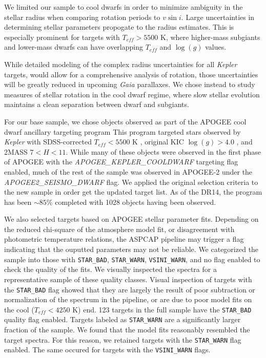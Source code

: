 \documentclass[manuscript]{aastex6}
\newcommand{\vsini}{\ensuremath{v \sin i}}
\newcommand{\Kepler}{\mbox{\textit{Kepler}}}
\newcommand{\Gaia}{\mbox{\textit{Gaia}}}
\newcommand{\Teff}{\ensuremath{T_{eff}}}
\newcommand{\logg}{\ensuremath{\log(g)}}
\newcommand{\STARBAD}{\texttt{STAR\_BAD}}
\newcommand{\STARWARN}{\texttt{STAR\_WARN}}
\newcommand{\VSINIWARN}{\texttt{VSINI\_WARN}}
\begin{document}
We limited our sample to cool dwarfs in order to minimize ambiguity in the 
stellar radius when comparing rotation periods to \vsini. Large uncertainties 
in determining stellar parameters propogate to the radius estimates. This is 
especially prominent for targets with \(\Teff > 5500\) K, where higher-mass 
subgiants and lower-mass dwarfs can have overlapping \Teff{} and
\logg{} values.

While detailed modeling of the complex radius uncertainties 
for all \Kepler{} targets, would allow for a comprehensive analysis of
rotation, those uncertainties will be greatly reduced in upcoming
\Gaia{} parallaxes. We chose instead to study measures of
stellar rotation in the cool  dwarf regime, where
slow stellar evolution maintains a clean separation between dwarf and
subgiants. 

For our base sample, we chose objects observed as part of the APOGEE cool
dwarf ancillary targeting
program
This program targeted stars observed by \Kepler{} with SDSS-corrected
\(\Teff < 5500\) K \citep{Pinsonneault12}, original KIC \(\logg > 4.0\)
\citep{Brown11}, and 2MASS \(7 < H < 11\). While many of these objects
were observed in the first phase of APOGEE with the
\textit{APOGEE\_KEPLER\_COOLDWARF} targeting flag enabled, much of the rest of
the sample was observed in APOGEE-2 under the \textit{APOGEE2\_SEISMO\_DWARF}
flag. We applied the original selection criteria to the new sample in order get
the updated target list. As of the DR14, 
the program has been \(\sim 85\)\% completed with 1028 objects having been 
observed. 

We also selected targets based on APOGEE stellar parameter fits.
Depending on the reduced chi-square of the atmosphere model fit, or
disagreement with photometric temperature relations, the ASPCAP pipeline
may trigger a flag indicating that the ouputted parameters may not be
reliable. We categorized the sample into those with \STARBAD, \STARWARN,
\VSINIWARN{}, and no flag enabled to check the quality of the fits. We
visually inspected the spectra for a representative sample of these
quality classes. 
Visual inspection of targets with the \STARBAD{} flag showed that they are 
largely the result of poor subtraction or normalization of the spectrum in the
pipeline, or are due to poor model fits on the cool (\(\Teff < 4250\) K) end. 
123 targets in the full sample have the \STARBAD{} quality flag enabled. 
Targets labeled as \STARWARN{} are a significantly larger fraction of the 
sample. We found that the model fits reasonably resembled the target spectra. 
For this reason, we retained targets with the \STARWARN{} flag enabled. The 
same occured for targets with the \VSINIWARN{} flags.
\end{document}
